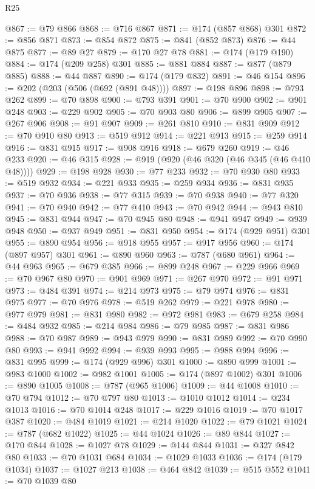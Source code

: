 \begin{lexlean}{R25}
\begin{coremodule}
@867 := @79 @866
@868 := @716 @867
@871 := @174 (@857 @868) @301
@872 := @856 @871
@873 := @854 @872
@875 := @841 (@852 @873)
@876 := @44 @875
@877 := @89 @27
@879 := @170 @27 @78
@881 := @174 (@179 @190)
@884 := @174 (@209 @258) @301
@885 := @881 @884
@887 := @877 (@879 @885)
@888 := @44 @887
@890 := @174 (@179 @832)
@891 := @46 @154
@896 := @202 (@203 (@506 (@692 (@891 @48))))
@897 := @198 @896
@898 := @793 @262
@899 := @70 @898
@900 := @793 @391
@901 := @70 @900
@902 := @901 @248
@903 := @229 @902
@905 := @70 @903 @80
@906 := @899 @905
@907 := @267 @906
@908 := @91 @907
@909 := @261 @810
@910 := @831 @909
@912 := @70 @910 @80
@913 := @519 @912
@914 := @221 @913
@915 := @259 @914
@916 := @831 @915
@917 := @908 @916
@918 := @679 @260
@919 := @46 @233
@920 := @46 @315
@928 := @919 (@920 (@46 @320 (@46 @345 (@46 @410 @48))))
@929 := @198 @928
@930 := @77 @233
@932 := @70 @930 @80
@933 := @519 @932
@934 := @221 @933
@935 := @259 @934
@936 := @831 @935
@937 := @70 @936
@938 := @77 @315
@939 := @70 @938
@940 := @77 @320
@941 := @70 @940
@942 := @77 @410
@943 := @70 @942
@944 := @943 @810
@945 := @831 @944
@947 := @70 @945 @80
@948 := @941 @947
@949 := @939 @948
@950 := @937 @949
@951 := @831 @950
@954 := @174 (@929 @951) @301
@955 := @890 @954
@956 := @918 @955
@957 := @917 @956
@960 := @174 (@897 @957) @301
@961 := @890 @960
@963 := @787 (@680 @961)
@964 := @44 @963
@965 := @679 @385
@966 := @899 @248
@967 := @229 @966
@969 := @70 @967 @80
@970 := @901 @969
@971 := @267 @970
@972 := @91 @971
@973 := @484 @391
@974 := @214 @973
@975 := @79 @974
@976 := @831 @975
@977 := @70 @976
@978 := @519 @262
@979 := @221 @978
@980 := @977 @979
@981 := @831 @980
@982 := @972 @981
@983 := @679 @258
@984 := @484 @932
@985 := @214 @984
@986 := @79 @985
@987 := @831 @986
@988 := @70 @987
@989 := @943 @979
@990 := @831 @989
@992 := @70 @990 @80
@993 := @941 @992
@994 := @939 @993
@995 := @988 @994
@996 := @831 @995
@999 := @174 (@929 @996) @301
@1000 := @890 @999
@1001 := @983 @1000
@1002 := @982 @1001
@1005 := @174 (@897 @1002) @301
@1006 := @890 @1005
@1008 := @787 (@965 @1006)
@1009 := @44 @1008
@1010 := @70 @794
@1012 := @70 @797 @80
@1013 := @1010 @1012
@1014 := @234 @1013
@1016 := @70 @1014 @248
@1017 := @229 @1016
@1019 := @70 @1017 @387
@1020 := @484 @1019
@1021 := @214 @1020
@1022 := @79 @1021
@1024 := @787 (@682 @1022)
@1025 := @44 @1024
@1026 := @89 @844
@1027 := @170 @844
@1028 := @1027 @78
@1029 := @144 @844
@1031 := @327 @842 @80
@1033 := @70 @1031 @684
@1034 := @1029 @1033
@1036 := @174 (@179 @1034)
@1037 := @1027 @213
@1038 := @464 @842
@1039 := @515 @552
@1041 := @70 @1039 @80

\end{coremodule}
\end{lexlean}
